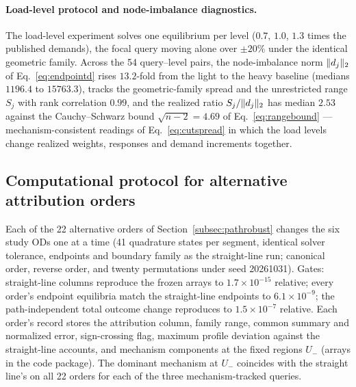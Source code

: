 \paragraph{Load-level protocol and node-imbalance diagnostics.}
The load-level experiment solves one equilibrium per level ($0.7$,
$1.0$, $1.3$ times the published demands), the focal query moving
alone over $\pm20\%$ under the identical geometric family. Across the
54 query--level pairs, the node-imbalance norm $\lVert d_j \rVert_2$ of
Eq.~\eqref{eq:endpointd} rises $13.2$-fold from the light to the
heavy baseline (medians $1196.4$ to $15763.3$), tracks the
geometric-family spread and the unrestricted range $S_j$ with rank
correlation $0.99$, and the realized ratio $S_j/\lVert d_j \rVert_2$ has
median $2.53$ against the Cauchy--Schwarz bound $\sqrt{n-2}=4.69$ of
Eq.~\eqref{eq:rangebound} --- mechanism-consistent readings of
Eq.~\eqref{eq:cutspread} in which the load levels change realized
weights, responses and demand increments together.

\subsection{Computational protocol for alternative attribution orders}\label{supp:pathrobust}
Each of the 22 alternative orders of Section~\ref{subsec:pathrobust}
changes the six study ODs one at a time (41 quadrature states per
segment, identical solver tolerance, endpoints and boundary family as
the straight-line run; canonical order, reverse order, and twenty
permutations under seed 20261031). Gates: straight-line columns
reproduce the frozen arrays to $1.7\times10^{-15}$ relative; every
order's endpoint equilibria match the straight-line endpoints to
$6.1\times10^{-9}$; the path-independent total outcome change
reproduces to $1.5\times10^{-7}$ relative. Each order's record stores
the attribution column, family range, common summary and normalized
error, sign-crossing flag, maximum profile deviation against the
straight-line accounts, and mechanism components at the fixed regions
$U_-$ (arrays in the code package). The dominant mechanism at $U_-$
coincides with the straight line's on all 22 orders for each of the
three mechanism-tracked queries.

